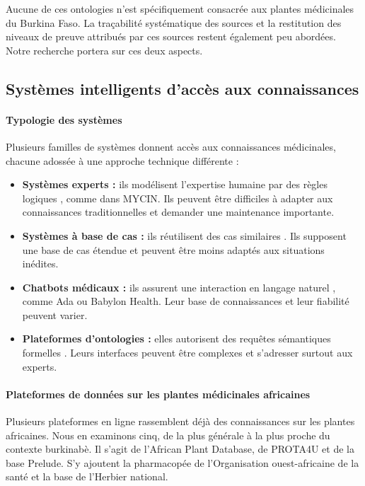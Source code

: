 Aucune de ces ontologies n'est spécifiquement consacrée aux plantes médicinales du Burkina Faso. La traçabilité systématique des sources et la restitution des niveaux de preuve attribués par ces sources restent également peu abordées. Notre recherche portera sur ces deux aspects.

\subsection{Systèmes intelligents d'accès aux connaissances}
\label{subsec:systemes_intelligents}

\paragraph{Typologie des systèmes}
Plusieurs familles de systèmes donnent accès aux connaissances médicinales, chacune adossée à une approche technique différente :
\begin{itemize}[label={$\bullet$}, leftmargin=1cm]
    \item \textbf{Systèmes experts :} ils modélisent l'expertise humaine par des règles logiques \cite{buchanan1984rulebased}, comme dans MYCIN. Ils peuvent être difficiles à adapter aux connaissances traditionnelles et demander une maintenance importante.
    \item \textbf{Systèmes à base de cas :} ils réutilisent des cas similaires \cite{kolodner1993casebased}. Ils supposent une base de cas étendue et peuvent être moins adaptés aux situations inédites.
    \item \textbf{Chatbots médicaux :} ils assurent une interaction en langage naturel \cite{hussain2018chatbot}, comme Ada ou Babylon Health. Leur base de connaissances et leur fiabilité peuvent varier.
    \item \textbf{Plateformes d'ontologies :} elles autorisent des requêtes sémantiques formelles \cite{studer1998knowledge}. Leurs interfaces peuvent être complexes et s'adresser surtout aux experts.
\end{itemize}

\paragraph{Plateformes de données sur les plantes médicinales africaines}
Plusieurs plateformes en ligne rassemblent déjà des connaissances sur les plantes africaines. Nous en examinons cinq, de la plus générale à la plus proche du contexte burkinabè. Il s'agit de l'African Plant Database, de PROTA4U et de la base Prelude. S'y ajoutent la pharmacopée de l'Organisation ouest-africaine de la santé et la base de l'Herbier national.

